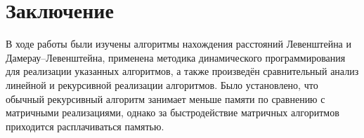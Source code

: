 \documentclass[12pt,a4paper]{article}
\begin{document}
\section*{\Huge Заключение}
В ходе работы были изучены алгоритмы нахождения расстояний Левенштейна и Дамерау–Левенштейна, применена методика динамического программирования для реализации указанных алгоритмов, а также произведён сравнительный анализ линейной и рекурсивной реализации алгоритмов. Было установлено, что обычный рекурсивный алгоритм занимает меньше памяти по сравнению с матричными реализациями, однако за быстродействие матричных алгоритмов приходится расплачиваться памятью.
\end{document}
